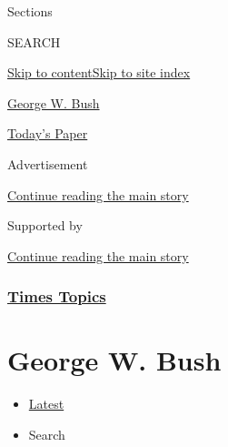 Sections

SEARCH

\protect\hyperlink{site-content}{Skip to
content}\protect\hyperlink{site-index}{Skip to site index}

\href{https://www.nytimes.com/topic/person/george-w-bush}{George W.
Bush}

\href{https://myaccount.nytimes.com/auth/login?response_type=cookie\&client_id=vi}{}

\href{https://www.nytimes.com/section/todayspaper}{Today's Paper}

Advertisement

\protect\hyperlink{after-top}{Continue reading the main story}

Supported by

\protect\hyperlink{after-sponsor}{Continue reading the main story}

\hypertarget{times-topics}{%
\subsubsection{\texorpdfstring{\href{/index.html}{Times
Topics}}{Times Topics}}\label{times-topics}}

\hypertarget{george-w-bush}{%
\section{George W. Bush}\label{george-w-bush}}

\begin{itemize}
\tightlist
\item
  \protect\hyperlink{stream-panel}{Latest}
\item
  Search
\end{itemize}

